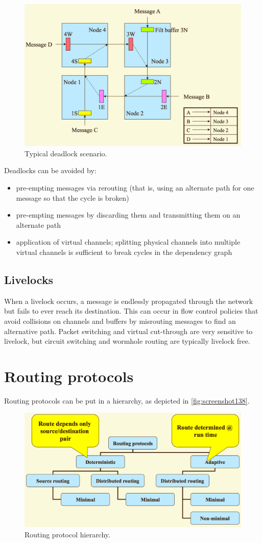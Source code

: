 \begin{figure}
\centering
\includegraphics[width=0.7\linewidth]{screenshot137}
\caption{Typical deadlock scenario.}
\label{fig:screenshot137}
\end{figure}

Deadlocks can be avoided by: \begin{itemize}
\item pre-empting messages via rerouting (that is, using an alternate path for one message so that the cycle is broken)
\item pre-empting messages by discarding them and transmitting them on an alternate path
\item application of virtual channels; splitting physical channels into multiple virtual channels is sufficient to break cycles in the dependency graph
\end{itemize}

\subsection{Livelocks}
When a livelock occurs, a message is endlessly propagated through the network but fails to ever reach its destination. This can occur in flow control policies that avoid collisions on channels and buffers by misrouting messages to find an alternative path. Packet switching and virtual cut-through are very sensitive to livelock, but circuit switching and wormhole routing are typically livelock free.

\section{Routing protocols}
Routing protocols can be put in a hierarchy, as depicted in \autoref{fig:screenshot138}.

\begin{figure}
\centering
\includegraphics[width=0.7\linewidth]{screenshot138}
\caption{Routing protocol hierarchy.}
\label{fig:screenshot138}
\end{figure}

